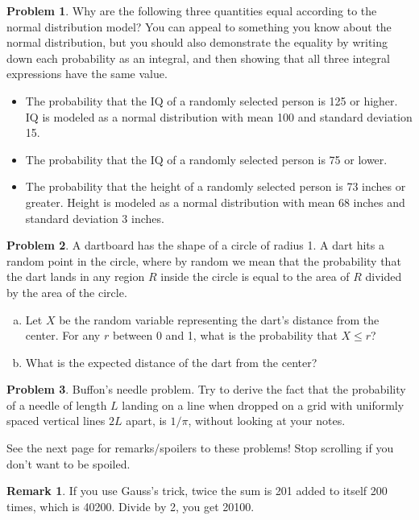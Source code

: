 \documentclass[11pt,oneside]{amsart}
\theoremstyle{definition}
\newtheorem{problem}{Problem}
\newtheorem{remark}{Remark}
\begin{document}
\begin{problem}
Why are the following three quantities equal according to the normal distribution model? You can appeal to something you know about the normal distribution, but you should also demonstrate the equality by writing down each probability as an integral, and then showing that all three integral expressions have the same value.
\begin{itemize}
  \item The probability that the IQ of a randomly selected person is 125 or higher. IQ is modeled as a normal distribution with mean 100 and standard deviation 15.
  \item The probability that the IQ of a randomly selected person is 75 or lower.
  \item The probability that the height of a randomly selected person is 73 inches or greater. Height is modeled as a normal distribution with mean 68 inches and standard deviation 3 inches.
\end{itemize}
\end{problem}

\begin{problem}
A dartboard has the shape of a circle of radius 1. A dart hits a random point in the circle, where by random we mean that the probability that the dart lands in any region $R$ inside the circle is equal to the area of $R$ divided by the area of the circle.
\begin{enumerate}[(a)]
  \item Let $X$ be the random variable representing the dart's distance from the center. For any $r$ between 0 and 1, what is the probability that $X\leq r$?
  \item What is the expected distance of the dart from the center?
\end{enumerate}
\end{problem}

\begin{problem}
Buffon's needle problem. Try to derive the fact that the probability of a needle of length $L$ landing on a line when dropped on a grid with uniformly spaced vertical lines $2L$ apart, is $1/\pi$, without looking at your notes.
\end{problem}

\bigskip
See the next page for remarks/spoilers to these problems! Stop scrolling if you don't want to be spoiled.

\newpage

\begin{remark}
  If you use Gauss's trick, twice the sum is 201 added to itself 200 times, which is 40200. Divide by 2, you get 20100.
\end{remark}
\end{document}
